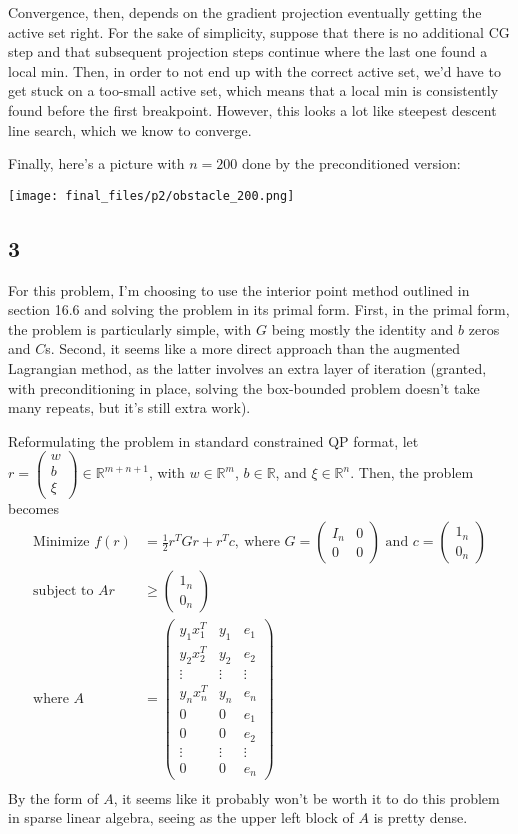 \documentclass{article}
\newcommand{\openm}{\begin{pmatrix}}
\newcommand{\closem}{\end{pmatrix}}
\newcommand{\rn}{\mathbb{R}}
\begin{document}
Convergence, then, depends on the gradient projection eventually getting the active set right. For the sake of simplicity, suppose that there is no additional CG step and that subsequent projection steps continue where the last one found a local min. Then, in order to not end up with the correct active set, we'd have to get stuck on a too-small active set, which means that a local min is consistently found before the first breakpoint. However, this looks a lot like steepest descent line search, which we know to converge.

Finally, here's a picture with $n=200$ done by the preconditioned version:

\texttt{[image: final\_files/p2/obstacle\_200.png]}
\subsection*{3}
For this problem, I'm choosing to use the interior point method outlined in section 16.6 and solving the problem in its primal form. First, in the primal form, the problem is particularly simple, with $G$ being mostly the identity and $b$ zeros and $C$s. Second, it seems like a more direct approach than the augmented Lagrangian method, as the latter involves an extra layer of iteration (granted, with preconditioning in place, solving the box-bounded problem doesn't take many repeats, but it's still extra work). 

Reformulating the problem in standard constrained QP format, let $r=\openm w\\b\\\xi\closem\in\rn^{m+n+1}$, with $w\in\rn^m$, $b\in\rn$, and $\xi\in\rn^n$. Then, the problem becomes 
\begin{align*}
    \text{Minimize }f(r)&=\frac{1}{2}r^TGr+r^Tc,\ \text{where }G=\openm I_n&0\\0&0\closem\text{ and }c=\openm1_n\\0_n\closem\\
    \text{subject to }Ar&\geq\openm1_n\\0_n\closem\\
    \text{where }A&=\openm y_1x_1^T&y_1&e_1\\y_2x_2^T&y_2&e_2\\\vdots&\vdots&\vdots\\y_nx_n^T&y_n&e_n\\0&0&e_1\\0&0&e_2\\\vdots&\vdots&\vdots\\0&0&e_n\closem\\
\end{align*}
By the form of $A$, it seems like it probably won't be worth it to do this problem in sparse linear algebra, seeing as the upper left block of $A$ is pretty dense. 
\end{document}
